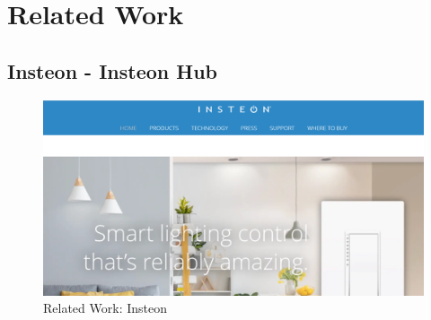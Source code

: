 \documentclass[12pt, oneside, a4paper]{book}
\begin{document}
			
		\newpage	
		\section{Related Work}
		\subsection{Insteon - Insteon Hub}
		\begin{figure}[H]
			\includegraphics[width=\linewidth]{img/insteon.png}
  			\caption{Related Work: Insteon}
  			\label{related:insteon}
		\end{figure}
\end{document}
